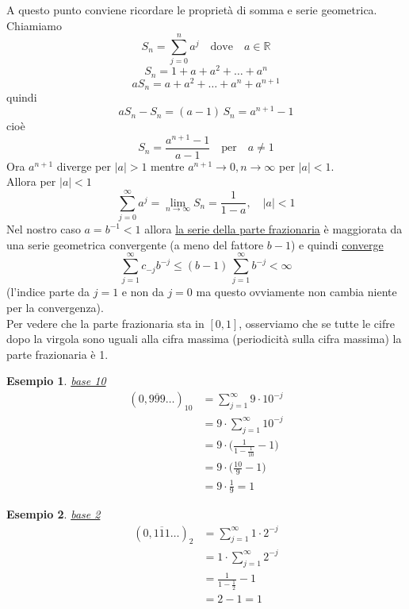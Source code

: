 \documentclass[12pt]{article}
\newtheorem*{esempio}{Esempio}
\begin{document}
A questo punto conviene ricordare le proprietà di somma e serie geometrica. 
Chiamiamo \[ S_n = \sum_{j=0}^{n}a^j \quad \text{dove} \quad a \in \mathbb{R} \]
\[ S_n = 1 + a + a^2 + \dotsc + a^n \]
\[ aS_n = a + a^2 + \dotsc + a^n + a^{n+1} \]
quindi \[ aS_n - S_n = (a - 1)\,S_n = a^{n+1} -1 \]
cioè \[ S_n = \frac{a^{n+1} - 1}{a - 1} \quad \text{per} \quad a \ne 1 \]
Ora $a^{n+1}$ diverge per $\lvert a\rvert > 1$ mentre $a^{n+1} \longrightarrow 0 , n \to \infty $ per $\lvert a\rvert < 1$.\\
Allora per $\lvert a\rvert < 1$
\[ \sum_{j=0}^{\infty}a^j = \lim_{n \to \infty} S_n = \frac{1}{1 - a} , \quad \lvert a\rvert < 1 \]
Nel nostro caso $a = b^{-1} < 1$ allora \underline{la serie della parte frazionaria} è maggiorata da una serie geometrica convergente (a meno del fattore $b-1$) e quindi \underline{converge}
\[ \sum_{j=1}^{\infty}c_{-j}b^{-j} \le (b-1)\,\sum_{j=1}^{\infty}b^{-j} < \infty \]
(l'indice parte da $j = 1$ e non da $j = 0$ ma questo ovviamente non cambia niente per la convergenza). \\
Per vedere che la parte frazionaria sta in $[0,1]$, osserviamo che se tutte le cifre dopo la virgola sono uguali alla cifra massima (periodicità sulla cifra massima) la parte frazionaria è 1.

\begin{esempio}
\underline{base 10}
\[ \begin{split}
    (0,\overline{999} \dotsc)_{10} & = \sum_{j=1}^{\infty} 9 \cdot 10^{-j} \\
    & = 9 \cdot \sum_{j=1}^{\infty} 10^{-j} \\
    & = 9 \cdot \biggl( \frac{1}{1 - \frac{1}{10}} - 1 \biggr) \\
    & = 9 \cdot \biggl( \frac{10}{9} - 1 \biggr) \\
    & = 9 \cdot \frac{1}{9} = 1
\end{split} \]
\end{esempio}
\begin{esempio}
\underline{base 2}
\[ \begin{split}
    (0,\overline{111} \dotsc)_{2} & = \sum_{j=1}^{\infty} 1 \cdot 2^{-j} \\
    & = 1 \cdot \sum_{j=1}^{\infty} 2^{-j} \\
    & = \frac{1}{1 - \frac{1}{2}} - 1 \\
    & = 2 - 1 = 1
\end{split} \]
\end{esempio}
\end{document}
